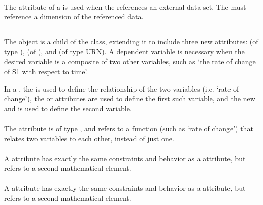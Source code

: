 \begin{blockChanged}
\paragraph*{}
The  attribute of a \RemainingDimension is used when the \Variable references an external data set.  The  must reference a dimension of the referenced data.


\subsection{}
\label{class:dependentVariable}

The \DependentVariable object is a child of the \Variable class, extending it to include three new attributes:   (of type ),  (of ), and  (of type URN).  A dependent variable is necessary when the desired variable is a composite of two other variables, such as `the rate of change of S1 with respect to time'.

In a \DependentVariable, the  is used to define the relationship of the two variables (i.e. `rate of change'), the  or  attributes are used to define the first such variable, and the new  and  is used to define the second variable.  

\paragraph*{}
\label{sec:term}
The  attribute is of type , and refers to a function (such as `rate of change') that relates two variables to each other, instead of just one.

\paragraph*{}
\label{sec:target2}
A  attribute has exactly the same constraints and behavior as a  attribute, but refers to a second mathematical element.

\paragraph*{}
\label{sec:symbol2}
A  attribute has exactly the same constraints and behavior as a  attribute, but refers to a second mathematical element.



\end{blockChanged}
